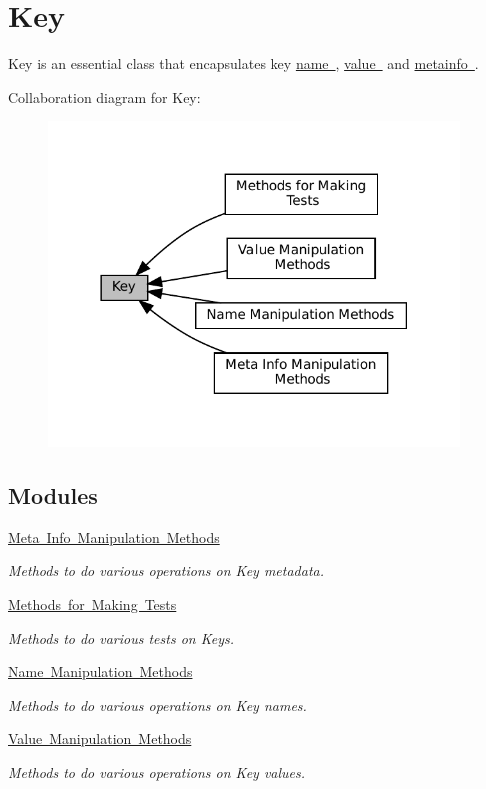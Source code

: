 \hypertarget{group__key}{}\section{Key}
\label{group__key}


Key is an essential class that encapsulates key \mbox{\hyperlink{group__keyname}{name }}, \mbox{\hyperlink{group__keyvalue}{value }} and \mbox{\hyperlink{group__keymeta}{metainfo }}.  


Collaboration diagram for Key\+:
\nopagebreak
\begin{figure}[H]
\begin{center}
\leavevmode
\includegraphics[width=309pt]{group__key}
\end{center}
\end{figure}
\subsection*{Modules}
\begin{DoxyCompactItemize}
\item 
\mbox{\hyperlink{group__keymeta}{Meta Info Manipulation Methods}}
\begin{DoxyCompactList}\small\item\em Methods to do various operations on Key metadata. \end{DoxyCompactList}\item 
\mbox{\hyperlink{group__keytest}{Methods for Making Tests}}
\begin{DoxyCompactList}\small\item\em Methods to do various tests on Keys. \end{DoxyCompactList}\item 
\mbox{\hyperlink{group__keyname}{Name Manipulation Methods}}
\begin{DoxyCompactList}\small\item\em Methods to do various operations on Key names. \end{DoxyCompactList}\item 
\mbox{\hyperlink{group__keyvalue}{Value Manipulation Methods}}
\begin{DoxyCompactList}\small\item\em Methods to do various operations on Key values. \end{DoxyCompactList}\end{DoxyCompactItemize}
